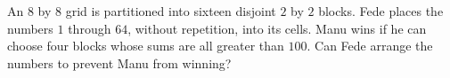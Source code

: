 An $8$ by $8$ grid is partitioned into sixteen disjoint $2$ by $2$ blocks. Fede places the numbers $1$ through $64$, without repetition, into its cells. Manu wins if he can choose four blocks whose sums are all greater than $100$. Can Fede arrange the numbers to prevent Manu from winning?
